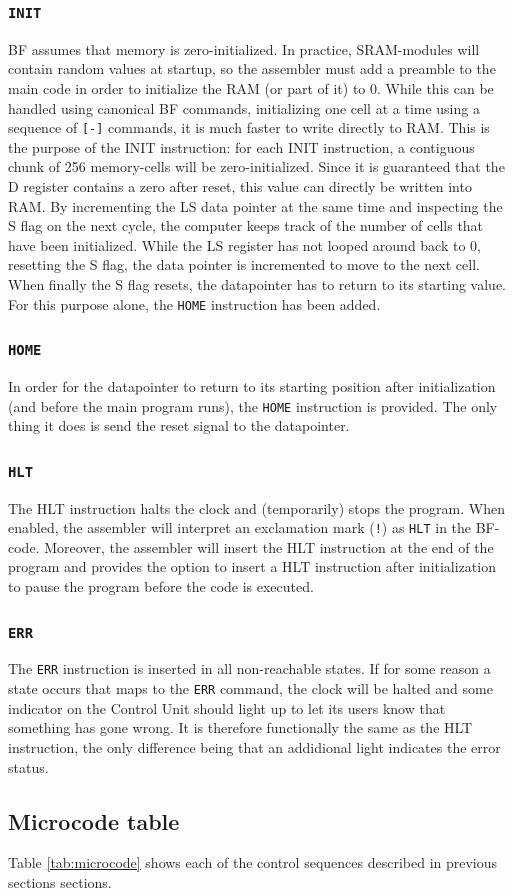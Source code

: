 \subsubsection{\texttt{INIT}}
BF assumes that memory is zero-initialized. In practice, SRAM-modules will contain random values at startup, so the assembler must add a preamble to the main code in order to initialize the RAM (or part of it) to 0. While this can be handled using canonical BF commands, initializing one cell at a time using a sequence of \texttt{[-]} commands, it is much faster to write directly to RAM. This is the purpose of the INIT instruction: for each INIT instruction, a contiguous chunk of 256 memory-cells will be zero-initialized. Since it is guaranteed that the D register contains a zero after reset, this value can directly be written into RAM. By incrementing the LS data pointer at the same time and inspecting the S flag on the next cycle, the computer keeps track of the number of cells that have been initialized. While the LS register has not looped around back to 0, resetting the S flag, the data pointer is incremented to move to the next cell. When finally the S flag resets, the datapointer has to return to its starting value. For this purpose alone, the \texttt{HOME} instruction has been added.

\subsubsection{\texttt{HOME}}
In order for the datapointer to return to its starting position after initialization (and before the main program runs), the \texttt{HOME} instruction is provided. The only thing it does is send the reset signal to the datapointer.

\subsubsection{\texttt{HLT}}
The HLT instruction halts the clock and (temporarily) stops the program. When enabled, the assembler will interpret an exclamation mark (\texttt{!}) as \texttt{HLT} in the BF-code. Moreover, the assembler will insert the HLT instruction at the end of the program and provides the option to insert a HLT instruction after initialization to pause the program before the code is executed. 

\subsubsection{\texttt{ERR}}
The \texttt{ERR} instruction is inserted in all non-reachable states. If for some reason a state occurs that maps to the \texttt{ERR} command, the clock will be halted and some indicator on the Control Unit should light up to let its users know that something has gone wrong. It is therefore functionally the same as the HLT instruction, the only difference being that an addidional light indicates the error status.

\subsection{Microcode table}
Table \ref{tab:microcode} shows each of the control sequences described in previous sections sections.





